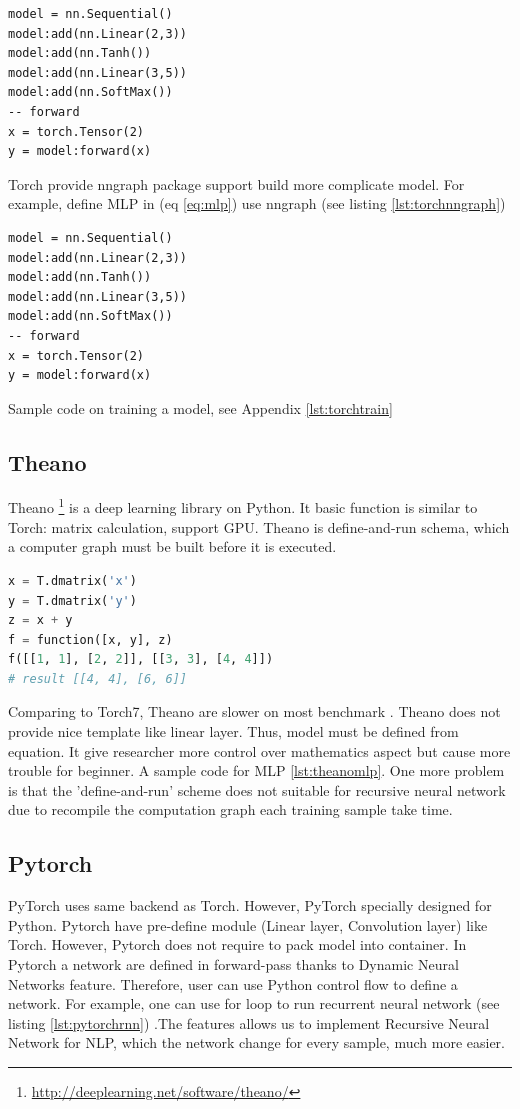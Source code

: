 \begin{lstlisting}[caption={MLP in Torch},label={lst:torchmlp}, language={[5.1]Lua}]
model = nn.Sequential()
model:add(nn.Linear(2,3))
model:add(nn.Tanh())
model:add(nn.Linear(3,5))
model:add(nn.SoftMax())
-- forward
x = torch.Tensor(2)
y = model:forward(x)
\end{lstlisting}

Torch provide nngraph package support build more complicate model. For example, define MLP in (eq \ref{eq:mlp}) use nngraph (see listing \ref{lst:torchnngraph})

\begin{lstlisting}[caption={MLP using nngraph},label={lst:torchnngraph}, language={[5.1]Lua}]
model = nn.Sequential()
model:add(nn.Linear(2,3))
model:add(nn.Tanh())
model:add(nn.Linear(3,5))
model:add(nn.SoftMax())
-- forward
x = torch.Tensor(2)
y = model:forward(x)
\end{lstlisting}

Sample code on training a model, see Appendix \ref{lst:torchtrain}

\subsection{Theano}
Theano \footnote{\url{http://deeplearning.net/software/theano/}} is a deep learning library on Python. It basic function is similar to Torch: matrix calculation, support GPU. Theano is define-and-run schema, which a computer graph must be built before it is executed.

\begin{lstlisting}[caption={Define function in Theano},label={lst:theanof}, language={python}]
x = T.dmatrix('x')
y = T.dmatrix('y')
z = x + y
f = function([x, y], z)
f([[1, 1], [2, 2]], [[3, 3], [4, 4]])
# result [[4, 4], [6, 6]]
\end{lstlisting}

Comparing to Torch7, Theano are slower on most benchmark \cite{collobert2011torch7}. Theano does not provide nice template like linear layer. Thus, model must be defined from equation. It give researcher more control over mathematics aspect but cause more trouble for beginner. A sample code for MLP \ref{lst:theanomlp}. One more problem is that the 'define-and-run' scheme does not suitable for recursive neural network due to recompile the computation graph each training sample take time.

\subsection{Pytorch}
PyTorch uses same backend as Torch. However, PyTorch specially designed for Python. Pytorch have pre-define module (Linear layer, Convolution layer) like Torch. However, Pytorch does not require to pack model into container. In Pytorch a network are defined in forward-pass thanks to Dynamic Neural Networks feature. Therefore, user can use Python control flow to define a network. For example, one can use for loop to run recurrent neural network (see listing \ref{lst:pytorchrnn}) .The features allows us to implement Recursive Neural Network for NLP, which the network change for every sample, much more easier.

